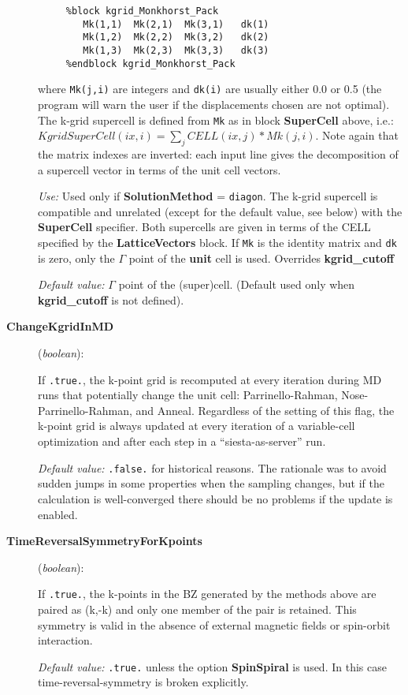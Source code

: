 \begin{description}
\begin{verbatim}
     %block kgrid_Monkhorst_Pack
        Mk(1,1)  Mk(2,1)  Mk(3,1)   dk(1)
        Mk(1,2)  Mk(2,2)  Mk(3,2)   dk(2)
        Mk(1,3)  Mk(2,3)  Mk(3,3)   dk(3)
     %endblock kgrid_Monkhorst_Pack
\end{verbatim}

where \texttt{Mk(j,i)} are integers and \texttt{dk(i)} are usually
either 0.0 or 0.5 (the program will warn the user if the displacements
chosen are not optimal).
The k-grid supercell is defined from \texttt{Mk}
as in block \textbf{SuperCell} above, i.e.:
$KgridSuperCell(ix,i) = \sum_j CELL(ix,j)*Mk(j,i)$.
Note again that the matrix indexes are inverted: each input line
gives the decomposition of a supercell vector in terms of the unit
cell vectors.


\textit{Use:} Used only if \textbf{SolutionMethod} = \texttt{diagon}.
The k-grid supercell is compatible and unrelated
(except for the default value, see below)
with the \textbf{SuperCell} specifier. Both supercells are given in
terms of the CELL specified by the \textbf{LatticeVectors} block.
If \texttt{Mk} is the identity matrix and \texttt{dk}
is zero, only the $\Gamma$ point of the \textbf{unit} cell is used.
Overrides \textbf{kgrid\_cutoff}

\textit{Default value:} $\Gamma$ point of the (super)cell.
(Default used only when \textbf{kgrid\_cutoff} is not defined).

\item[\textbf{ChangeKgridInMD}] (\textit{boolean}):

If \texttt{.true.}, the k-point grid is
recomputed at every iteration during MD runs that potentially
change the unit cell: Parrinello-Rahman, Nose-Parrinello-Rahman, and
Anneal. Regardless of the setting of this flag, the k-point grid
is always updated at every iteration of a variable-cell optimization
and after each step in a ``siesta-as-server'' run.

\textit{Default value:} \texttt{.false.} for historical reasons. The
rationale was to avoid sudden jumps in some properties when the
sampling changes, but if the calculation is well-converged there
should be no problems if the update is enabled.

\item[\textbf{TimeReversalSymmetryForKpoints}] (\textit{boolean}):

If \texttt{.true.}, the k-points in the BZ generated by the methods above
are paired as (k,-k) and only one member of the pair is retained. This
symmetry is valid in the absence of external magnetic fields or
spin-orbit interaction.

\textit{Default value:} \texttt{.true.} unless the option \textbf{SpinSpiral} 
is used. In this case time-reversal-symmetry is broken explicitly.

\end{description}

